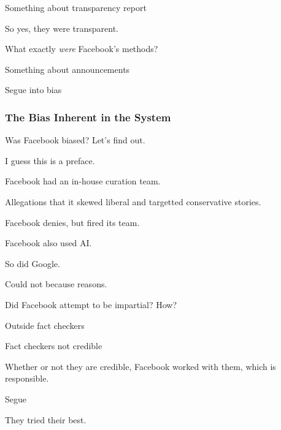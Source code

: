 \par Something about transparency report \cite{fb_info_ops}

\par So yes, they were transparent.


\par What exactly \emph{were} Facebook's methods?

\par Something about announcements

\par Segue into bias

\subsubsection{The Bias Inherent in the System}

\par Was Facebook biased? Let's find out.


\par I guess this is a preface.


\par Facebook had an in-house curation team.
\par Allegations that it skewed liberal and targetted conservative stories.
\par Facebook denies, but fired its team. \cite{tc_ai}


\par Facebook also used AI. \cite{tc_ai}

\par So did Google.

\par Could not because reasons. \cite{ai_cannot_win}


\par Did Facebook attempt to be impartial? How?

\par Outside fact checkers \cite{tc_downranks}

\par Fact checkers not credible \cite{vox_sentences}

\par Whether or not they are credible, Facebook worked with them, which is responsible.

\par Segue


\par They tried their best.
